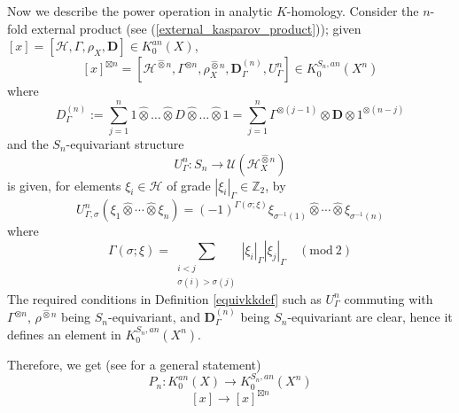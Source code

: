 \documentclass[11pt,leqno,twoside]{amsart}
\theoremstyle{plainsl}
\theoremstyle{definition}
\newcommand{\cH}{\mathcal{H}}
\newcommand{\bD}{\mathbf{D}}
\begin{document}
Now we describe the power operation in analytic $K$-homology.   Consider 
the $n$-fold external product (see (\ref{external_kasparov_product})); given $[x]=[\cH,\Gamma,\rho_X,\bD] \in K^{an}_0(X)$, 
\begin{equation}\label{poweropanal}
    [x]^{\boxtimes n}=[\cH^{\widehat{\otimes}n},\Gamma^{\otimes n},\rho_X^{\widehat{\otimes}n},\bD_{\Gamma}^{(n)},U_{\Gamma}^n] \in K^{S_n,an}_0(X^n)
\end{equation}
where
  $$D_{\Gamma}^{(n)}:=\sum^n_{j=1} 1\widehat{\otimes} \ldots \widehat{\otimes} D\widehat{\otimes} \ldots \widehat{\otimes} 1=\sum_{j=1}^n
\Gamma^{\otimes(j-1)}
\otimes \bD \otimes 1^{\otimes(n-j)}$$
and  the $S_n$-equivariant structure
\[
U_{\Gamma}^n:S_n\to
    \mathcal U(\mathcal{H}_X^{\widehat{\otimes}n})
    \]
    is given, for elements
    $\xi_i\in\mathcal H$ of grade
    $|\xi_i|_{\Gamma}\in\mathbb Z_2$, by
    \begin{equation}\label{gpsign}
         U_{\Gamma,\sigma}^{n}(\xi_1\widehat{\otimes}\cdots
    \widehat{\otimes}\xi_n)
    =
    (-1)^{\Gamma(\sigma;\xi)}
    \xi_{\sigma^{-1}(1)}\widehat{\otimes}
    \cdots\widehat{\otimes}
    \xi_{\sigma^{-1}(n)}
    \end{equation}
    where
    \[
    \Gamma(\sigma;\xi)
    =
    \sum_{\substack{i<j\\
    \sigma(i)>\sigma(j)}}
    |\xi_i|_{\Gamma}|\xi_j|_{\Gamma}
    \quad(\mathrm{mod}\ 2)
    \]
    The required conditions in Definition \ref{equivkkdef} such as $U_{\Gamma}^n$ commuting with $\Gamma^{\otimes n}$, $\rho^{\widehat{\otimes}n}$ being $S_n$-equivariant, and $\bD_{\Gamma}^{(n)}$ being $S_n$-equivariant are clear, hence it defines an element in $K^{S_n,an}_0(X^n)$.































 Therefore, we get (see \cite[Lemma~2.4]{CEKN} for a general statement)
\begin{equation}\label{powerop_ank}
    P_n:K^{an}_0(X)\rightarrow K_0^{S_n,an}(X^n)
\end{equation}
\[[x]\rightarrow [x]^{\boxtimes n}\]
\end{document}
